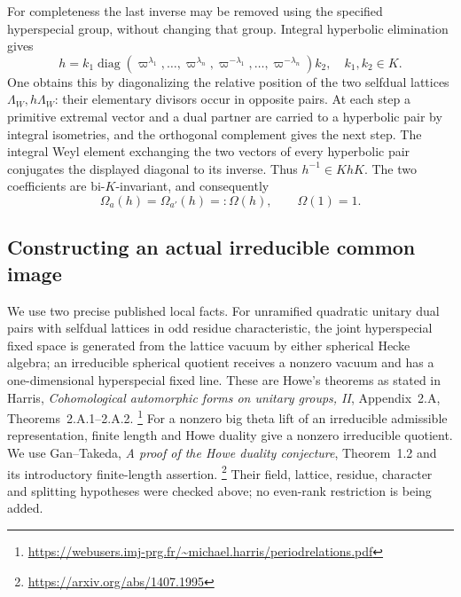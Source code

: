 For completeness the last inverse may be removed using the
specified hyperspecial group, without changing that group.
Integral hyperbolic elimination gives
\[
 h=k_1\operatorname{diag}
   (\varpi^{\lambda_1},\ldots,\varpi^{\lambda_n},
    \varpi^{-\lambda_1},\ldots,\varpi^{-\lambda_n})k_2,
 \quad k_1,k_2\in K.
\]
One obtains this by diagonalizing the relative position of
the two selfdual lattices \(\Lambda_W,h\Lambda_W\):
their elementary divisors occur in opposite pairs.
At each step a primitive extremal vector and a dual partner
are carried to a hyperbolic pair by integral isometries,
and the orthogonal complement gives the next step.
The integral Weyl element exchanging the two vectors of
every hyperbolic pair conjugates the displayed diagonal
to its inverse. Thus \(h^{-1}\in KhK\).
The two coefficients are bi-\(K\)-invariant, and consequently
\begin{equation}\label{eq:sr-inert-common-spherical-function}
                    \Omega_a(h)=\Omega_{a'}(h)=:\Omega(h),
                       \qquad\Omega(1)=1.
\end{equation}

\subsection{Constructing an actual irreducible common image}
We use two precise published local facts. For unramified quadratic
unitary dual pairs with selfdual lattices in odd residue
characteristic, the joint hyperspecial fixed space is generated
from the lattice vacuum by either spherical Hecke algebra;
an irreducible spherical quotient receives a nonzero vacuum
and has a one-dimensional hyperspecial fixed line.
These are Howe's theorems as stated in Harris,
\emph{Cohomological automorphic forms on unitary groups, II},
Appendix~2.A, Theorems~2.A.1--2.A.2.
\footnote{\url{https://webusers.imj-prg.fr/~michael.harris/periodrelations.pdf}}
For a nonzero big theta lift of an irreducible admissible
representation, finite length and Howe duality give a nonzero
irreducible quotient. We use Gan--Takeda,
\emph{A proof of the Howe duality conjecture},
Theorem~1.2 and its introductory finite-length assertion.
\footnote{\url{https://arxiv.org/abs/1407.1995}}
Their field, lattice, residue, character and splitting hypotheses
were checked above; no even-rank restriction is being added.

